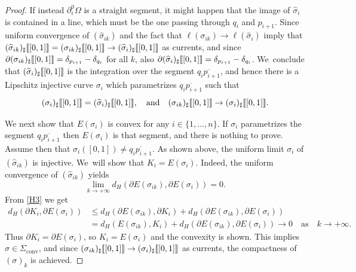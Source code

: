 \documentclass[JEP,XML,SOM,Unicode, NoFloatCountersInSection,published]{cedram}
\let\curves\Sigma
\let\Om\Omega
\newcommand\convexcurves{\curves_\mathrm{conv}}
\newcommand{\jump}[1]{\textup{\textlbrackdbl}{#1}\textup{\textrbrackdbl}}
\theoremstyle{definition}
\begin{document}
\begin{proof}
If instead $\partial_i^0\Om$
is a straight segment, it might happen that the image of $\widehat\sigma_i$ is contained in a line, which must be the one passing through $q_i$ and $p_{i+1}$. Since uniform convergence of $(\widehat\sigma_{ik})$ and the fact that $\ell(\sigma_{ik})\to\ell(\widehat\sigma_i)$ imply that $(\widehat\sigma_{ik})_\sharp\jump{[0,1]}=(\sigma_{ik})_\sharp\jump{[0,1]}\to (\widehat\sigma_{i})_\sharp\jump{[0,1]}$ as currents, and since $\partial(\sigma_{ik})_\sharp\jump{[0,1]}=\delta_{p_{i+1}}-\delta_{q_i}$ for all $k$, also $\partial(\widehat\sigma_{i})_\sharp\jump{[0,1]}=\delta_{p_{i+1}}-\delta_{q_i}$. We~conclude that $(\widehat\sigma_{i})_\sharp\jump{[0,1]}$ is the integration over the segment $\overline{q_i p_{i+1}}$, and hence there is a Lipschitz injective curve $\sigma_i$ which parametrizes $\overline{q_i p_{i+1}}$ such that
\[
(\sigma_{i})_\sharp\jump{[0,1]}=(\widehat\sigma_{i})_\sharp\jump{[0,1]},\quad\text{and}\quad
(\sigma_{ik})_\sharp\jump{[0,1]}\to (\sigma_{i})_\sharp\jump{[0,1]}.
\]

We next show that $E(\sigma_i)$
is convex for any $i \in \{1,\dots, n\}$. If $\sigma_i$ parametrizes the segment $\overline{q_i p_{i+1}}$ then $E(\sigma_i)$ is that segment, and there is nothing to prove. Assume then that $\sigma_i([0,1])\neq \overline{q_i p_{i+1}}$. As shown above, the uniform limit $\sigma_i$ of $(\widehat\sigma_{ik})$ is injective. We~will show that $K_i=E(\sigma_i)$. Indeed, the uniform convergence of $(\widehat\sigma_{ik})$ yields
\[
\lim_{k\to+\infty}d_H(\partial E(\sigma_{ik}),\partial E(\sigma_{i}))=0.
\]
From \ref{H3} we get
\begin{align*}
d_H(\partial K_i, \partial E(\sigma_i))&\le d_H(\partial E(\sigma_{ik}),\partial K_i)+ d_H(\partial E(\sigma_{ik}),\partial E(\sigma_{i}))\\
&= d_H( E(\sigma_{ik}),K_i)+ d_H(\partial E(\sigma_{ik}),\partial E(\sigma_{i}))\to0\quad\text{as}\quad k\to+\infty.
\end{align*}
Thus $\partial K_i\!=\!\partial E(\sigma_{i})$, so $K_i\!=\! E(\sigma_{i})$ and the convexity is shown. This implies $\sigma\!\in\! \convexcurves$, and since $(\sigma_{ik})_\sharp\jump{[0,1]}\to (\sigma_{i})_\sharp\jump{[0,1]}$ as currents, the compactness of $(\sigma)_k$ is achieved.


\end{proof}
\end{document}

